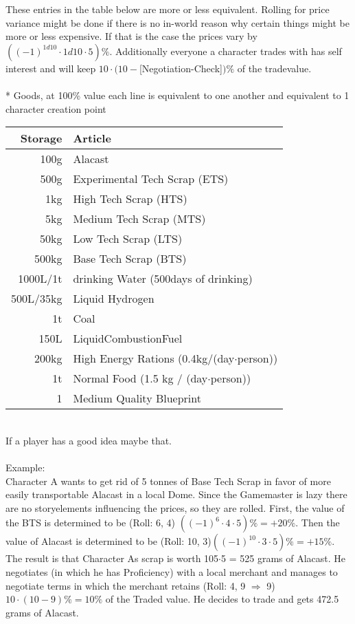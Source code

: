 \documentclass{article}
\begin{document}
These entries in the table below are more or less equivalent. Rolling for price
variance might be done if there is no in-world reason why certain things might be more or less expensive.
If that is the case the prices vary by \(((-1)^{1d10}\cdot1d10\cdot5) \%\).
Additionally everyone a character trades with has self interest and will keep \(10\cdot(10-\)[Negotiation-Check]\()\%\) of
the tradevalue.\\ \\*
Goods, at 100\% value each line is equivalent to one another and equivalent to 1 character creation point \\
\begin{tabular}{r|l}
Storage & Article\\\hline
100g & Alacast\\\hline
500g & Experimental Tech Scrap (ETS)\\\hline
1kg & High Tech Scrap (HTS)\\\hline
5kg & Medium Tech Scrap (MTS)\\\hline
50kg & Low Tech Scrap (LTS)\\\hline
500kg & Base Tech Scrap (BTS)\\\hline
1000L/1t & drinking Water (500days of drinking)\\\hline
500L/35kg & Liquid Hydrogen\\\hline
1t & Coal\\\hline
150L & LiquidCombustionFuel\\\hline
200kg & High Energy Rations (0.4kg/(day\(\cdot\)person))\\\hline
1t & Normal Food (1.5 kg / (day\(\cdot\)person))\\\hline
1 & Medium Quality Blueprint\\\hline

\end{tabular}\\
If a player has a good idea maybe that.\\
\\
Example:\\
Character A wants to get rid of 5 tonnes of Base Tech Scrap in favor of more easily transportable Alacast in a local Dome.
Since the Gamemaster is lazy there are no storyelements influencing the prices, so they are rolled. First, the value of
the BTS is determined to be (Roll: 6, 4) \(((-1)^{6}\cdot4\cdot5) \% = +20\%\). Then the value of Alacast is determined to be
(Roll: 10, 3)\(((-1)^{10}\cdot3\cdot5) \% = +15\%\). The result is that Character As scrap is worth 105\(\cdot\)5 = 525 grams of Alacast.
He negotiates (in which he has Proficiency) with a local merchant and manages to negotiate terms in which the merchant retains
(Roll: 4, 9 \(\Rightarrow\) 9) \(10\cdot(10-9)\% = 10\%\) of the Traded value. He decides to trade and gets 472.5 grams of Alacast.\\
\end{document}
